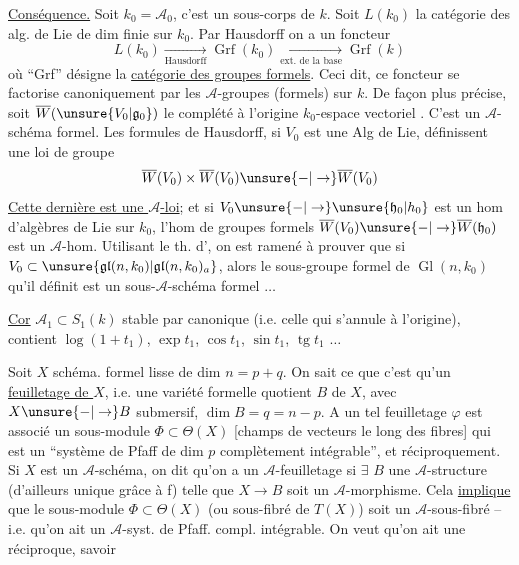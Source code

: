 \uline{Conséquence.} Soit $k_0=\mathcal A_0$, c'est un sous-corps de $k$. Soit $L(k_0)$ la catégorie des alg. de Lie de dim finie sur $k_0$. Par Hausdorff on a un foncteur
\[
L(k_0)\xrightarrow[\text{Hausdorff}]{}\operatorname{Grf}(k_0)\xrightarrow[\text{ext. de la base}]{}\operatorname{Grf}(k)
\]
où ``Grf'' désigne la \uline{catégorie des groupes formels}.
Ceci dit, ce foncteur se factorise canoniquement par les $\mathcal A$-groupes (formels) sur $k$. De façon plus précise, soit $\overline W(\unsure{V_0|\mathfrak g_0})$ le complété à l'origine  $k_0$-espace vectoriel . C'est un $\mathcal A$-schéma formel.
Les formules de Hausdorff, si $V_0$ est une Alg de Lie, définissent une loi de groupe
\[
\overline W(V_0)\times\overline W(V_0)\unsure{-|\to}\overline W(V_0)
\]
\uline{Cette dernière est une $\mathcal A$-loi};  et si
$V_0\unsure{-|\to}\unsure{\mathfrak h_0|h_0}$ est un hom d'algèbres de Lie sur $k_0$, l'hom de groupes formels $\overline W(V_0)\unsure{-|\to}\overline W(\mathfrak h_0)$ est un $\mathcal A$-hom.
Utilisant le th. d', on est ramené à prouver que si $V_0\subset\unsure{\mathfrak{gl}(n,k_0)|\mathfrak{gl}(n,k_0)_a}$, alors le sous-groupe formel de $\operatorname{Gl}(n,k_0)$ qu'il définit est un sous-$\mathcal A$-schéma formel $\ldots$
\margin{$-$}

\uline{Cor} $\mathcal A_1\subset S_1(k)$ stable par  canonique (i.e. celle qui s'annule à l'origine), contient $\log(1+t_1)$, $\exp t_1$, $\cos t_1$, $\sin t_1$, $\operatorname{tg}t_1$ $\ldots$

Soit $X$ schéma. formel lisse de dim $n=p+q$. On sait ce que c'est qu'un \uline{feuilletage de $X$}, i.e. une variété formelle quotient $B$ de $X$, avec $X\unsure{-|\to}B$ submersif, $\dim B=q=n-p$. A un tel feuilletage $\varphi$ est associé un sous-module $\Phi\subset\Theta(X)$ [champs de vecteurs le long des fibres] qui est un ``système de Pfaff de dim $p$ complètement intégrable'', et réciproquement. Si $X$ est un $\mathcal A$-schéma, on dit qu'on a un $\mathcal A$-feuilletage si $\exists$ $B$ une $\mathcal A$-structure (d'ailleurs unique\unsure{\}|)} grâce à f) telle que $X\longrightarrow B$ soit un $\mathcal A$-morphisme. Cela \uline{implique} que le sous-module $\Phi\subset\Theta(X)$ (ou sous-fibré de $T(X)$) soit un $\mathcal A$-sous-fibré -- i.e. qu'on ait un $\mathcal A$-syst. de Pfaff. compl. intégrable. On veut qu'on ait une réciproque, savoir

